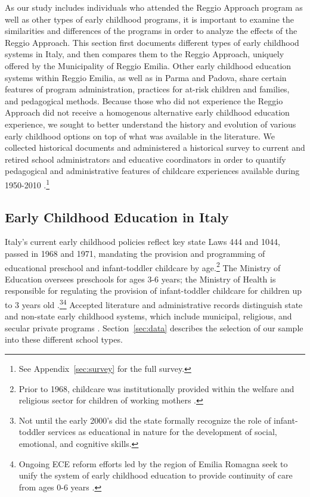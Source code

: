 
As our study includes individuals who attended the Reggio Approach program as well as other types of early childhood programs, it is important to examine the similarities and differences of the programs in order to analyze the effects of the Reggio Approach. This section first documents different types of early childhood systems in Italy, and then compares them to the Reggio Approach, uniquely offered by the Municipality of Reggio Emilia. Other early childhood education systems within Reggio Emilia, as well as in Parma and Padova, share certain features of program administration, practices for at-risk children and families, and pedagogical methods. Because those who did not experience the Reggio Approach did not receive a homogenous alternative early childhood education experience, we sought to better understand the history and evolution of various early childhood options on top of what was available in the literature. We collected historical documents \citep{Padova-Admin-Data_1964-2011,Reggio-Admin-data_1966-2006,Reggio-Annual-Journals_1994-2011} and administered a historical survey to current and retired school administrators and educative coordinators in order to quantify pedagogical and administrative features of childcare experiences available during 1950-2010 \citep{CEHD_2016_Historical-Analysis}.\footnote{See Appendix~\ref{sec:survey} for the full survey.} 

\subsection{Early Childhood Education in Italy}

Italy's current early childhood policies reflect key state Laws 444 and 1044, passed in 1968 and 1971, mandating the provision and programming of educational preschool and infant-toddler childcare by age.\footnote{Prior to 1968, childcare was institutionally provided within the welfare and religious sector for children of working mothers \citep{OECD_2001_Italy-Country-Note,Hohnerlein_2015_Development-and-Diffusion}.} The Ministry of Education oversees preschools for ages 3-6 years; the Ministry of Health is responsible for regulating the provision of infant-toddler childcare for children up to 3 years old \citep{Corsaro_1996_Early-Edu}.\footnote{Not until the early 2000's did the state formally recognize the role of infant-toddler services as educational in nature for the development of social, emotional, and cognitive skills.}\footnote{Ongoing ECE reform efforts led by the region of Emilia Romagna seek to unify the system of early childhood education to provide continuity of care from ages 0-6 years \citep{CEHD_2016_Historical-Analysis}.} Accepted literature and administrative records distinguish state and non-state early childhood systems, which include municipal, religious, and secular private programs \citep{Padova-Admin-Data_1964-2011,Reggio-Admin-data_1966-2006,Reggio-Annual-Journals_1994-2011,OECD_2001_Italy-Country-Note,Ribolzi_2013_Italy}. Section~\ref{sec:data} describes the selection of our sample into these different school types. 

